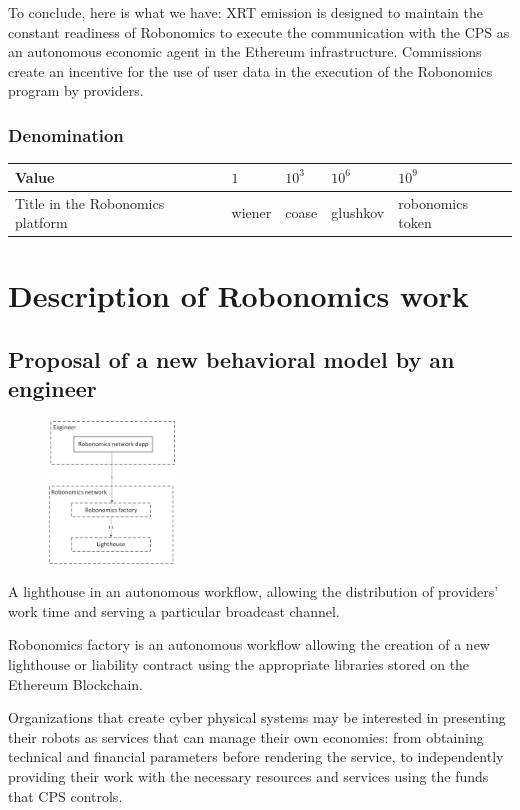 \documentclass{article}
\begin{document}
To conclude, here is what we have: XRT emission is designed to maintain the constant readiness of Robonomics to execute the communication with the CPS as an autonomous economic agent in the Ethereum infrastructure. Commissions create an incentive for the use of user data in the execution of the Robonomics program by providers.

\subsubsection{Denomination }
\begin{tabular}{ l |l |l |l |l}
 Value &  $1$ & $10^3$ & $10^6$  & $10^9$ \\ 
 \hline
 Title in the Robonomics platform &  wiener & coase  & glushkov & robonomics token\\ 
\end{tabular}

\section{Description of Robonomics work}
\subsection{Proposal of a new behavioral model by an engineer}

\begin{figure} %
    \centering
    \includegraphics[width=0.30\textwidth]{step-by-step-1.png}
\end{figure}

A lighthouse in an autonomous workflow, allowing the distribution of providers’ work time and serving a particular broadcast channel.

Robonomics factory is an autonomous workflow allowing the creation of a new lighthouse or liability contract using the appropriate libraries stored on the Ethereum Blockchain.

Organizations that create cyber physical systems may be interested in presenting their robots as services that can manage their own economies: from obtaining technical and financial parameters before rendering the service, to independently providing their work with the necessary resources and services using the funds that CPS controls.
\end{document}
